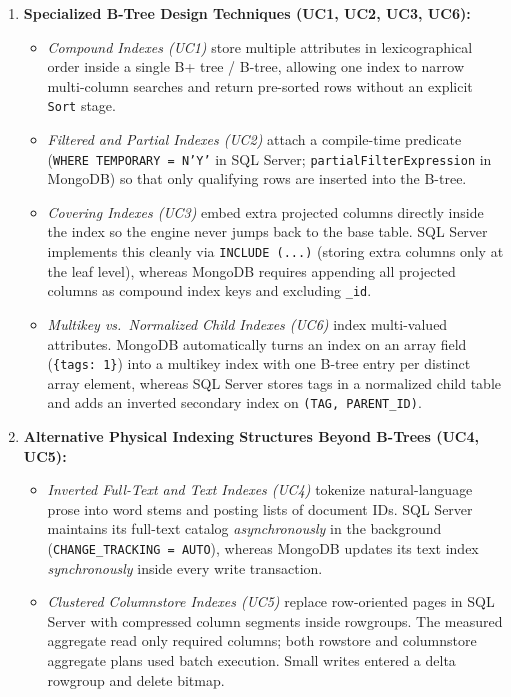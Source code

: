 \begin{enumerate}
\item \textbf{Specialized B-Tree Design Techniques (UC1, UC2, UC3, UC6):}
  \begin{itemize}
  \item \emph{Compound Indexes (UC1)} store multiple attributes in lexicographical order inside a single B+ tree / B-tree, allowing one index to narrow multi-column searches and return pre-sorted rows without an explicit \texttt{Sort} stage.
  \item \emph{Filtered and Partial Indexes (UC2)} attach a compile-time predicate (\texttt{WHERE TEMPORARY = N'Y'} in SQL Server; \texttt{partialFilterExpression} in MongoDB) so that only qualifying rows are inserted into the B-tree.
  \item \emph{Covering Indexes (UC3)} embed extra projected columns directly inside the index so the engine never jumps back to the base table. SQL Server implements this cleanly via \texttt{INCLUDE (...)} (storing extra columns only at the leaf level), whereas MongoDB requires appending all projected columns as compound index keys and excluding \texttt{\_id}.
  \item \emph{Multikey vs.\ Normalized Child Indexes (UC6)} index multi-valued attributes. MongoDB automatically turns an index on an array field (\texttt{\{tags: 1\}}) into a multikey index with one B-tree entry per distinct array element, whereas SQL Server stores tags in a normalized child table and adds an inverted secondary index on \texttt{(TAG, PARENT\_ID)}.
  \end{itemize}
\item \textbf{Alternative Physical Indexing Structures Beyond B-Trees (UC4, UC5):}
  \begin{itemize}
  \item \emph{Inverted Full-Text and Text Indexes (UC4)} tokenize natural-language prose into word stems and posting lists of document IDs. SQL Server maintains its full-text catalog \emph{asynchronously} in the background (\texttt{CHANGE\_TRACKING = AUTO}), whereas MongoDB updates its text index \emph{synchronously} inside every write transaction.
  \item \emph{Clustered Columnstore Indexes (UC5)} replace row-oriented pages in SQL Server with compressed column segments inside rowgroups. The measured aggregate read only required columns; both rowstore and columnstore aggregate plans used batch execution. Small writes entered a delta rowgroup and delete bitmap.
  \end{itemize}
\end{enumerate}

